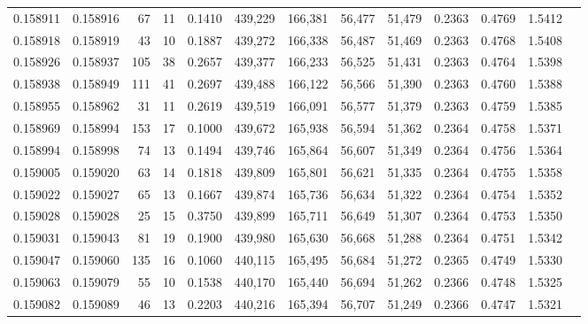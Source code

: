 \begin{tabular}{rrrrrrrrrrrrr}
0.158911 & 0.158916 &    67 &  11 &                                     0.1410 & 439,229 & 166,381 &  56,477 &  51,479 & 0.2363 & 0.4769 & 1.5412 \\
0.158918 & 0.158919 &    43 &  10 &                                     0.1887 & 439,272 & 166,338 &  56,487 &  51,469 & 0.2363 & 0.4768 & 1.5408 \\
0.158926 & 0.158937 &   105 &  38 &                                     0.2657 & 439,377 & 166,233 &  56,525 &  51,431 & 0.2363 & 0.4764 & 1.5398 \\
0.158938 & 0.158949 &   111 &  41 &                                     0.2697 & 439,488 & 166,122 &  56,566 &  51,390 & 0.2363 & 0.4760 & 1.5388 \\
0.158955 & 0.158962 &    31 &  11 &                                     0.2619 & 439,519 & 166,091 &  56,577 &  51,379 & 0.2363 & 0.4759 & 1.5385 \\
0.158969 & 0.158994 &   153 &  17 &                                     0.1000 & 439,672 & 165,938 &  56,594 &  51,362 & 0.2364 & 0.4758 & 1.5371 \\
0.158994 & 0.158998 &    74 &  13 &                                     0.1494 & 439,746 & 165,864 &  56,607 &  51,349 & 0.2364 & 0.4756 & 1.5364 \\
0.159005 & 0.159020 &    63 &  14 &                                     0.1818 & 439,809 & 165,801 &  56,621 &  51,335 & 0.2364 & 0.4755 & 1.5358 \\
0.159022 & 0.159027 &    65 &  13 &                                     0.1667 & 439,874 & 165,736 &  56,634 &  51,322 & 0.2364 & 0.4754 & 1.5352 \\
0.159028 & 0.159028 &    25 &  15 &                                     0.3750 & 439,899 & 165,711 &  56,649 &  51,307 & 0.2364 & 0.4753 & 1.5350 \\
0.159031 & 0.159043 &    81 &  19 &                                     0.1900 & 439,980 & 165,630 &  56,668 &  51,288 & 0.2364 & 0.4751 & 1.5342 \\
0.159047 & 0.159060 &   135 &  16 &                                     0.1060 & 440,115 & 165,495 &  56,684 &  51,272 & 0.2365 & 0.4749 & 1.5330 \\
0.159063 & 0.159079 &    55 &  10 &                                     0.1538 & 440,170 & 165,440 &  56,694 &  51,262 & 0.2366 & 0.4748 & 1.5325 \\
0.159082 & 0.159089 &    46 &  13 &                                     0.2203 & 440,216 & 165,394 &  56,707 &  51,249 & 0.2366 & 0.4747 & 1.5321 \\

\end{tabular}
